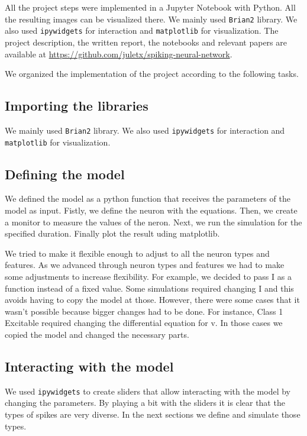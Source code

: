 \documentclass{article} %
\begin{document}
All the project steps were implemented in a Jupyter Notebook with Python. All the resulting images can be visualized there. We mainly used \texttt{Brian2} library. We also used \texttt{ipywidgets} for interaction and \texttt{matplotlib} for visualization. The project description, the written report, the notebooks and relevant papers are available at \url{https://github.com/juletx/spiking-neural-network}.

We organized the implementation of the project according to the following tasks.

\subsection{Importing the libraries}
We mainly used \texttt{Brian2} library. We also used \texttt{ipywidgets} for interaction and \texttt{matplotlib} for visualization.

\subsection{Defining the model}
We defined the model as a python function that receives the parameters of the model as input. Fistly, we define the neuron with the equations. Then, we create a monitor to measure the values of the neron. Next, we run the simulation for the specified duration. Finally plot the result uding matplotlib. 

We tried to make it flexible enough to adjust to all the neuron types and features. As we advanced through neuron types and features we had to make some adjustments to increase flexibility. For example, we decided to pass I as a function instead of a fixed value. Some simulations required changing I and this avoids having to copy the model at those. However, there were some cases that it wasn't possible because bigger changes had to be done. For instance, Class 1 Excitable required changing the differential equation for v. In those cases we copied the model and changed the necessary parts.

\subsection{Interacting with the model}
We used \texttt{ipywidgets} to create sliders that allow interacting with the model by changing the parameters. By playing a bit with the sliders it is clear that the types of spikes are very diverse. In the next sections we define and simulate those types.
 
\end{document}
